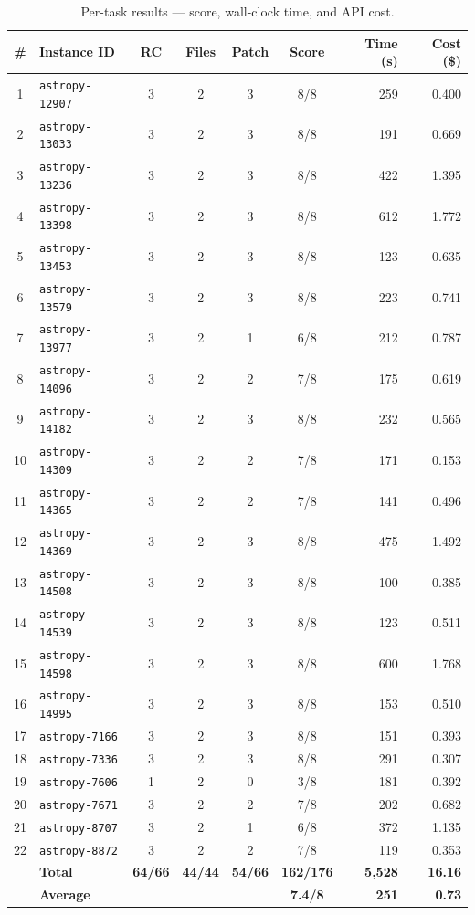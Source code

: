 \begin{table}[h]
\centering
\small
\caption{Per-task results — score, wall-clock time, and API cost.}\label{tab:per-task-raw}
\setlength{\tabcolsep}{4pt}
\begin{tabular}{clccccrr}
\toprule
\textbf{\#} & \textbf{Instance ID} & \textbf{RC} & \textbf{Files} & \textbf{Patch} & \textbf{Score} & \textbf{Time (s)} & \textbf{Cost (\$)} \\
\midrule
 1 & \texttt{astropy-12907} & 3 & 2 & 3 & 8/8 &   259 & 0.400 \\
 2 & \texttt{astropy-13033} & 3 & 2 & 3 & 8/8 &   191 & 0.669 \\
 3 & \texttt{astropy-13236} & 3 & 2 & 3 & 8/8 &   422 & 1.395 \\
 4 & \texttt{astropy-13398} & 3 & 2 & 3 & 8/8 &   612 & 1.772 \\
 5 & \texttt{astropy-13453} & 3 & 2 & 3 & 8/8 &   123 & 0.635 \\
 6 & \texttt{astropy-13579} & 3 & 2 & 3 & 8/8 &   223 & 0.741 \\
 7 & \texttt{astropy-13977} & 3 & 2 & 1 & 6/8 &   212 & 0.787 \\
 8 & \texttt{astropy-14096} & 3 & 2 & 2 & 7/8 &   175 & 0.619 \\
 9 & \texttt{astropy-14182} & 3 & 2 & 3 & 8/8 &   232 & 0.565 \\
10 & \texttt{astropy-14309} & 3 & 2 & 2 & 7/8 &   171 & 0.153 \\
11 & \texttt{astropy-14365} & 3 & 2 & 2 & 7/8 &   141 & 0.496 \\
12 & \texttt{astropy-14369} & 3 & 2 & 3 & 8/8 &   475 & 1.492 \\
13 & \texttt{astropy-14508} & 3 & 2 & 3 & 8/8 &   100 & 0.385 \\
14 & \texttt{astropy-14539} & 3 & 2 & 3 & 8/8 &   123 & 0.511 \\
15 & \texttt{astropy-14598} & 3 & 2 & 3 & 8/8 &   600 & 1.768 \\
16 & \texttt{astropy-14995} & 3 & 2 & 3 & 8/8 &   153 & 0.510 \\
17 & \texttt{astropy-7166}  & 3 & 2 & 3 & 8/8 &   151 & 0.393 \\
18 & \texttt{astropy-7336}  & 3 & 2 & 3 & 8/8 &   291 & 0.307 \\
19 & \texttt{astropy-7606}  & 1 & 2 & 0 & 3/8 &   181 & 0.392 \\
20 & \texttt{astropy-7671}  & 3 & 2 & 2 & 7/8 &   202 & 0.682 \\
21 & \texttt{astropy-8707}  & 3 & 2 & 1 & 6/8 &   372 & 1.135 \\
22 & \texttt{astropy-8872}  & 3 & 2 & 2 & 7/8 &   119 & 0.353 \\
\midrule
   & \textbf{Total}  & \textbf{64/66} & \textbf{44/44} & \textbf{54/66} & \textbf{162/176} & \textbf{5{,}528} & \textbf{16.16} \\
   & \textbf{Average} &       &       &       & \textbf{7.4/8}   & \textbf{251} & \textbf{0.73} \\
\bottomrule
\end{tabular}
\end{table}

